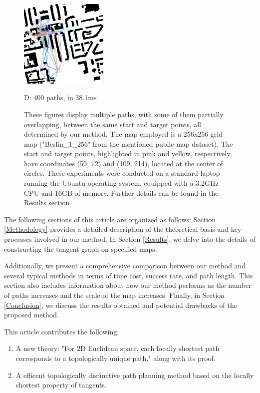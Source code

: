 \documentclass[letterpaper, 10 pt, journal, twoside]{IEEEtran}
\begin{document}
\begin{figure}[t]
\begin{minipage}{.48\linewidth}
\end{minipage}
\hfill
\begin{minipage}{.48\linewidth}
  \centerline{\includegraphics[width=4.2cm, cframe=gray 0.1mm]{400_RJ.png}}
  \centerline{D: 400 paths, in 38.1ms}
\end{minipage}
\vfill
\caption{These figures display multiple paths, with some of them partially overlapping, between the same start and target points, all determined by our method. The map employed is a 256x256 grid map ("Berlin\_1\_256" from the mentioned public map dataset). The start and target points, highlighted in pink and yellow, respectively, have coordinates (59, 72) and (109, 214), located at the center of circles. These experiments were conducted on a standard laptop running the Ubuntu operating system, equipped with a 3.2GHz CPU and 16GB of memory. Further details can be found in the Results section. }
\label{examples}
\end{figure}

The following sections of this article are organized as follows: Section \ref{Methodology} provides a detailed description of the theoretical basis and key processes involved in our method. In Section \ref{Results}, we delve into the details of constructing the tangent graph on specified maps.

Additionally, we present a comprehensive comparison between our method and several typical methods in terms of time cost, success rate, and path length. This section also includes information about how our method performs as the number of paths increases and the scale of the map increases. Finally, in Section \ref{Conclusion}, we discuss the results obtained and potential drawbacks of the proposed method.

This article contributes the following:

\begin{enumerate}
    \item A new theory: "For 2D Euclidean space, each locally shortest path corresponds to a topologically unique path," along with its proof.
    \item A efficent topologically distinctive path planning method based on the locally shortest property of tangents.
\end{enumerate}
\end{document}
